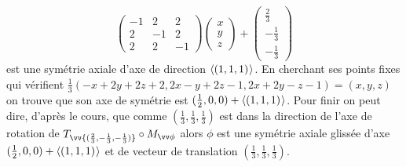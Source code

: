 \documentclass[a4paper,12pt,reqno]{amsart}
\begin{document}
\begin{solution}
\begin{enumerate}
\[        \begin{pmatrix}
          -1 &  2 &  2 \\
           2 & -1 &  2 \\
           2 &  2 & -1
        \end{pmatrix}
        \begin{pmatrix} x\\ y\\ z\end{pmatrix}
        +
        \begin{pmatrix} \frac23\\ -\frac13\\ -\frac13\end{pmatrix}
      \]
      est une symétrie axiale d'axe de direction $\langle{(1,1,1)}\kern.07em\rangle$. En cherchant ses points fixes qui vérifient $\frac{1}{3}(-x+2y+2z+2,2x-y+2z-1,2x+2y-z-1) = (x,y,z)$ on trouve que son axe de symétrie est $(\frac12,0,0)+\langle{(1,1,1)}\kern.07em\rangle$. Pour finir on peut dire, d'après le cours, que comme $(\frac13,\frac13,\frac13)$ est dans la direction de l'axe de rotation de $T_{\vv{(\frac23,-\frac13,-\frac13)}}\circ M_{\vv\phi}$ alors $\phi$ est une symétrie axiale glissée d'axe $(\frac12,0,0)+\langle{(1,1,1)}\kern.07em\rangle$ et de vecteur de translation $(\frac13,\frac13,\frac13)$.
  \end{enumerate}
\end{solution}
\end{document}
